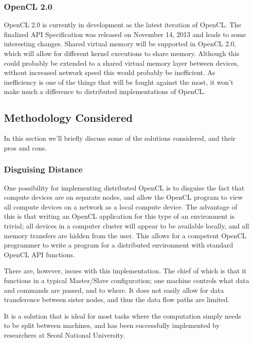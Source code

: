 \documentclass[../thesis.tex]{subfiles}
\begin{document}
        \subsubsection{OpenCL 2.0} %
        \label{ssub:opencl_2_0}
        OpenCL 2.0 is currently in development as the latest iteration of OpenCL. The finalized API Specification was released on November 14, 2013 and leads to some interesting changes. Shared virtual memory will be supported in OpenCL 2.0, which will allow for different kernel executions to share memory. Although this could probably be extended to a shared virtual memory layer between devices, without increased network speed this would probably be inefficient. As inefficiency is one of the things that will be fought against the most, it won't make much a difference to distributed implementations of OpenCL.

    \subsection{Methodology Considered} %
    \label{sub:methodology_considered}
    In this section we'll briefly discuss some of the solutions considered, and their pros and cons.
        \subsubsection{Disguising Distance} %
        \label{ssub:disguising_distance}
            One possibility for implementing distributed OpenCL is to disguise the fact that compute devices are on separate nodes, and allow the OpenCL program to view all compute devices on a network as a local compute device. The advantage of this is that writing an OpenCL application for this type of an environment is trivial; all devices in a computer cluster will appear to be available locally, and all memory transfers are hidden from the user. This allows for a competent OpenCL programmer to write a program for a distributed environment with standard OpenCL API functions.

            There are, however, issues with this implementation. The chief of which is that it functions in a typical Master/Slave configuration; one machine controls what data and commands are passed, and to where. It does not easily allow for data transference between sister nodes, and thus the data flow paths are limited.

            It is a solution that is ideal for most tasks where the computation simply needs to be split between machines, and has been successfully implemented by researchers at Seoul National University\cite{Kim:2012:SOF:2304576.2304623}.
\end{document}
